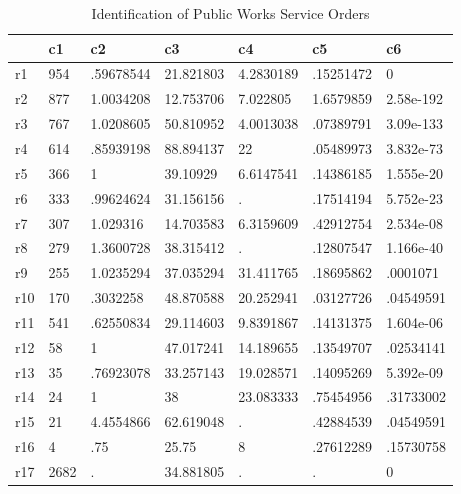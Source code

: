 \begin{table}[htbp]
\caption{\label{clabel} Identification of Public Works Service Orders}\centering\medskip
\begin{tabular}{|l|l|l|l|l|l|l|}\hline  
 & c1  & c2  & c3  & c4  & c5  & c6  \\ \hline  
r1 & 954 & .59678544 & 21.821803 & 4.2830189 & .15251472 & 0 \\ \hline 
r2 & 877 & 1.0034208 & 12.753706 & 7.022805 & 1.6579859 & 2.58e-192 \\ \hline 
r3 & 767 & 1.0208605 & 50.810952 & 4.0013038 & .07389791 & 3.09e-133 \\ \hline 
r4 & 614 & .85939198 & 88.894137 & 22 & .05489973 & 3.832e-73 \\ \hline 
r5 & 366 & 1 & 39.10929 & 6.6147541 & .14386185 & 1.555e-20 \\ \hline 
r6 & 333 & .99624624 & 31.156156 & . & .17514194 & 5.752e-23 \\ \hline 
r7 & 307 & 1.029316 & 14.703583 & 6.3159609 & .42912754 & 2.534e-08 \\ \hline 
r8 & 279 & 1.3600728 & 38.315412 & . & .12807547 & 1.166e-40 \\ \hline 
r9 & 255 & 1.0235294 & 37.035294 & 31.411765 & .18695862 & .0001071 \\ \hline 
r10 & 170 & .3032258 & 48.870588 & 20.252941 & .03127726 & .04549591 \\ \hline 
r11 & 541 & .62550834 & 29.114603 & 9.8391867 & .14131375 & 1.604e-06 \\ \hline 
r12 & 58 & 1 & 47.017241 & 14.189655 & .13549707 & .02534141 \\ \hline 
r13 & 35 & .76923078 & 33.257143 & 19.028571 & .14095269 & 5.392e-09 \\ \hline 
r14 & 24 & 1 & 38 & 23.083333 & .75454956 & .31733002 \\ \hline 
r15 & 21 & 4.4554866 & 62.619048 & . & .42884539 & .04549591 \\ \hline 
r16 & 4 & .75 & 25.75 & 8 & .27612289 & .15730758 \\ \hline 
r17 & 2682 & . & 34.881805 & . & . & 0 \\ \hline 
  \end{tabular}
\end{table}
